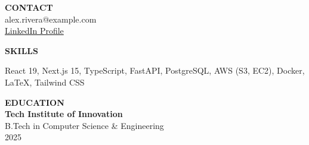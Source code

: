 \documentclass[10pt, letterpaper]{article}
\begin{document}
\pagestyle{empty}

\noindent
\begin{minipage}[t]{0.30\textwidth}
    \begin{tcolorbox}[
        colback=sidebarColor, colframe=sidebarColor, height=25.2cm, 
        before=\vspace{-12mm}, arc=0mm, sharp corners, top=10mm, left=4mm, right=4mm
    ]
        {\large \textbf{\color{accentColor}CONTACT}} \\
        \small alex.rivera@example.com \\
        \small \href{linkedin.com/in/alexrivera-dev}{LinkedIn Profile}
        
        \vspace{8mm}
        {\large \textbf{\color{accentColor}SKILLS}} \\
        \small \raggedright React 19, Next.js 15, TypeScript, FastAPI, PostgreSQL, AWS (S3, EC2), Docker, LaTeX, Tailwind CSS

        \vspace{8mm}
        {\large \textbf{\color{accentColor}EDUCATION}} \\
        \small \textbf{Tech Institute of Innovation} \\
        \small B.Tech in Computer Science & Engineering \\
        \small 2025
        \vfill%
    \end{tcolorbox}
\end{minipage}%
\hfill
\end{document}
